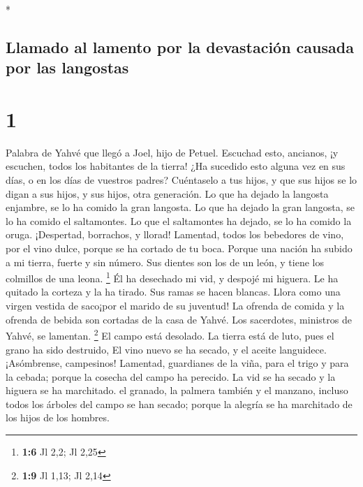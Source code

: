 \begin{paracol}{2} \switchcolumn[0]*

\hypertarget{llamado-al-lamento-por-la-devastaciuxf3n-causada-por-las-langostas}{%
\subsection{Llamado al lamento por la devastación causada por las
langostas}\label{llamado-al-lamento-por-la-devastaciuxf3n-causada-por-las-langostas}}

\hypertarget{section}{%
\section{1}\label{section}}

 Palabra de Yahvé que llegó a Joel, hijo de Petuel.
 Escuchad esto, ancianos, ¡y escuchen, todos los
habitantes de la tierra! ¿Ha sucedido esto alguna vez en sus días, o en
los días de vuestros padres?  Cuéntaselo a tus hijos, y
que sus hijos se lo digan a sus hijos, y sus hijos, otra generación.
 Lo que ha dejado la langosta enjambre, se lo ha comido la
gran langosta. Lo que ha dejado la gran langosta, se lo ha comido el
saltamontes. Lo que el saltamontes ha dejado, se lo ha comido la oruga.
 ¡Despertad, borrachos, y llorad! Lamentad, todos los
bebedores de vino, por el vino dulce, porque se ha cortado de tu boca.
 Porque una nación ha subido a mi tierra, fuerte y sin
número. Sus dientes son los de un león, y tiene los colmillos de una
leona. \footnote{\textbf{1:6} Jl 2,2; Jl 2,25}  Él ha
desechado mi vid, y despojé mi higuera. Le ha quitado la corteza y la ha
tirado. Sus ramas se hacen blancas.  Llora como una virgen
vestida de saco¡por el marido de su juventud!  La ofrenda
de comida y la ofrenda de bebida son cortadas de la casa de Yahvé. Los
sacerdotes, ministros de Yahvé, se lamentan. \footnote{\textbf{1:9} Jl
  1,13; Jl 2,14}  El campo está desolado. La tierra está
de luto, pues el grano ha sido destruido, El vino nuevo se ha secado, y
el aceite languidece.  ¡Asómbrense, campesinos! Lamentad,
guardianes de la viña, para el trigo y para la cebada; porque la cosecha
del campo ha perecido.  La vid se ha secado y la higuera
se ha marchitado. el granado, la palmera también y el manzano, incluso
todos los árboles del campo se han secado; porque la alegría se ha
marchitado de los hijos de los hombres.


\end{paracol}
